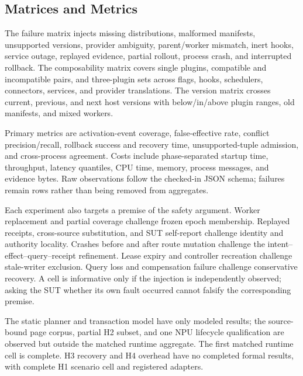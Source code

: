\documentclass[letterpaper,twocolumn,10pt]{article}
\begin{document}
\subsection{Matrices and Metrics}
The failure matrix injects missing distributions, malformed manifests,
unsupported versions, provider ambiguity, parent/worker mismatch, inert hooks,
service outage, replayed evidence, partial rollout, process crash, and
interrupted rollback.  The composability matrix covers single plugins,
compatible and incompatible pairs, and three-plugin sets across flags, hooks,
schedulers, connectors, services, and provider translations.  The version
matrix crosses current, previous, and next host versions with below/in/above
plugin ranges, old manifests, and mixed workers.

Primary metrics are activation-event coverage, false-effective rate, conflict
precision/recall, rollback success and recovery time, unsupported-tuple
admission, and cross-process agreement.  Costs include phase-separated startup
time, throughput, latency quantiles, CPU time, memory, process messages, and
evidence bytes.  Raw observations follow the checked-in JSON schema; failures
remain rows rather than being removed from aggregates.

Each experiment also targets a premise of the safety argument.  Worker
replacement and partial coverage challenge frozen epoch membership.  Replayed
receipts, cross-source substitution, and SUT self-report challenge identity and
authority locality.  Crashes before and after route mutation challenge the
intent--effect--query--receipt refinement.  Lease expiry and controller
recreation challenge stale-writer exclusion.  Query loss and compensation
failure challenge conservative recovery.  A cell is informative only if the
injection is independently observed; asking the SUT whether its own fault
occurred cannot falsify the corresponding premise.

The static planner and transaction model have only modeled results; the
source-bound page corpus, partial H2 subset, and one NPU lifecycle qualification
are observed but outside the matched runtime aggregate.  The first matched
runtime cell is complete.  H3 recovery and H4 overhead have no completed
formal results, with \ECPAFormalCompleted{} complete H1 scenario cell and
\ECPAVerifiedAdapters{} registered adapters.
\end{document}

